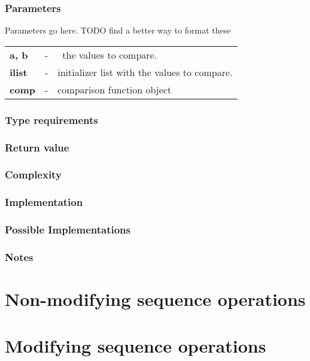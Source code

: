 \documentclass{article}
\begin{document}
\subsubsection{Parameters}
Parameters go here. TODO find a better way to format these\\
\begin{tabular}{ l  l  l }
    \textbf{a, b} \qquad &- \qquad & \ the values to compare.\\
    \textbf{ilist} &-& initializer list with the values to compare.\\
    \textbf{comp} &-& 	comparison function object 
\end{tabular}

\subsubsection{Type requirements}

\subsubsection{Return value}

\subsubsection{Complexity}

\subsubsection{Implementation}

\subsubsection{Possible Implementations}

\subsubsection{Notes}
\section{Non-modifying sequence operations}\label{NmSOs} 
\section{Modifying sequence operations}\label{MSOs} 
 
\end{document}
